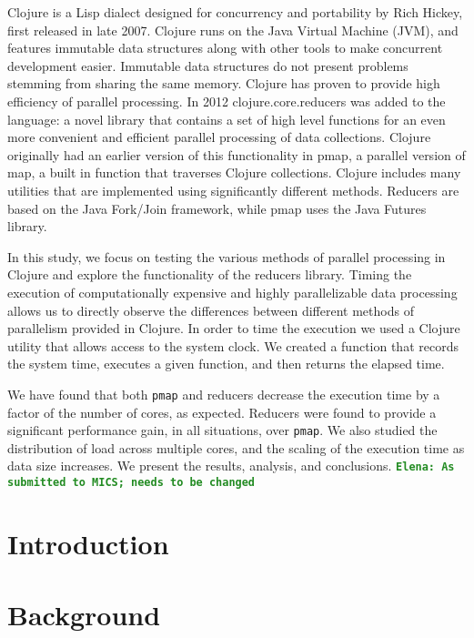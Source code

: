 \documentclass[12pt]{article}
\newcommand{\comment}[1]{{\bf \tt  {#1}}}
\newcommand{\emcomment}[1]{\textcolor{ForestGreen}{\comment{Elena: {#1}}}}
\newcommand{\clocode}[1]{{\texttt {#1}}}
\begin{document}
Clojure is a Lisp dialect designed for concurrency and portability by Rich Hickey, first released in late 2007. Clojure runs on the Java Virtual Machine (JVM), and features immutable data structures along with other tools to make concurrent development easier. Immutable data structures do not present problems stemming from sharing the same memory. Clojure has proven to provide high efficiency of parallel processing. In 2012 clojure.core.reducers was added to the language: a novel library that contains a set of high level functions for an even more convenient and efficient parallel processing of data collections. Clojure originally had an earlier version of this functionality in pmap, a parallel version of map, a built in function that traverses Clojure collections. Clojure includes many utilities that are implemented using significantly different methods. Reducers are based on the Java Fork/Join framework, while pmap uses the Java Futures library.


In this study, we focus on testing the various methods of parallel processing in Clojure and explore the functionality of the reducers library. Timing the execution of computationally expensive and highly parallelizable data processing allows us to directly observe the differences between different methods of parallelism provided in Clojure. In order to time the execution we used a Clojure utility that allows access to the system clock. We created a function that records the system time, executes a given function, and then returns the elapsed time.


We have found that both \clocode{pmap} and reducers decrease the execution time by a factor of the number of cores, as expected. Reducers were found to provide a significant performance gain, in all situations, over \clocode{pmap}. We also studied the distribution of load across multiple cores, and the scaling of the execution time as data size increases. We present the results, analysis, and conclusions.
\emcomment{As submitted to MICS; needs to be changed}



\setcounter{page}{1}


\section{Introduction}\label{sec:intro}




\section{Background}\label{sec:background}
\end{document}
